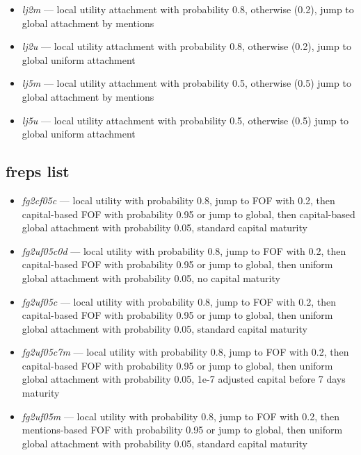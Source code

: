 \documentclass[10pt,oneside]{memoir}
\begin{document}
\begin{Spacing}{2}
\begin{itemize}
\item {\itshape lj2m} --- local utility attachment with probability 0.8, otherwise (0.2), jump to global attachment by mentions

\item {\itshape lj2u} --- local utility attachment with probability 0.8, otherwise (0.2), jump to global uniform attachment

\item {\itshape lj5m} --- local utility attachment with probability 0.5, otherwise (0.5) jump to global attachment by mentions

\item {\itshape lj5u} --- local utility attachment with probability 0.5, otherwise (0.5) jump to global uniform attachment
\end{itemize}

\pagebreak \subsection{freps list}
\label{frepslist}

\begin{itemize}


\item {\itshape fg2cf05c} --- local utility with probability 0.8, jump to FOF with 0.2, then capital-based FOF with probability 0.95 or jump to global, then capital-based global attachment with probability 0.05, standard capital maturity

\item {\itshape fg2uf05c0d} --- local utility with probability 0.8, jump to FOF with 0.2, then capital-based FOF with probability 0.95 or jump to global, then uniform global attachment with probability 0.05, no capital maturity

\item {\itshape fg2uf05c} --- local utility with probability 0.8, jump to FOF with 0.2, then capital-based FOF with probability 0.95 or jump to global, then uniform global attachment with probability 0.05, standard capital maturity

\item {\itshape fg2uf05c7m} --- local utility with probability 0.8, jump to FOF with 0.2, then capital-based FOF with probability 0.95 or jump to global, then uniform global attachment with probability 0.05, 1e-7 adjusted capital before 7 days maturity

\item {\itshape fg2uf05m} --- local utility with probability 0.8, jump to FOF with 0.2, then mentions-based FOF with probability 0.95 or jump to global, then uniform global attachment with probability 0.05, standard capital maturity


\end{itemize}
\end{Spacing}
\end{document}

